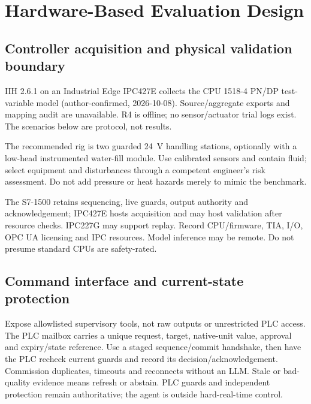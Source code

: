 \section{Hardware-Based Evaluation Design}
\label{sec:hardware}
\subsection{Controller acquisition and physical validation boundary}
IIH 2.6.1 on an Industrial Edge IPC427E collects the CPU 1518-4 PN/DP
test-variable model (author-confirmed, 2026-10-08). Source/aggregate exports and
mapping audit are unavailable. R4 is offline; no sensor/actuator trial logs
exist. The scenarios below are protocol, not results.

The recommended rig is two guarded 24~V handling stations, optionally with a
low-head instrumented water-fill module. Use calibrated sensors and contain
fluid; select equipment and disturbances through a competent engineer's risk
assessment. Do not add pressure or heat hazards merely to mimic the benchmark.

The S7-1500 retains sequencing, live guards, output authority and acknowledgement;
IPC427E hosts acquisition and may host validation after resource checks. IPC227G
may support replay. Record CPU/firmware, TIA, I/O, OPC UA licensing and IPC
resources. Model inference may be remote. Do not presume standard CPUs are
safety-rated.

\subsection{Command interface and current-state protection}
Expose allowlisted supervisory tools, not raw outputs or unrestricted PLC access.
The PLC mailbox carries a unique request, target, native-unit value, approval
and expiry/state reference. Use a staged sequence/commit handshake, then have
the PLC recheck current guards and record its decision/acknowledgement. Commission
duplicates, timeouts and reconnects without an LLM. Stale or bad-quality evidence
means refresh or abstain. PLC guards and independent protection remain authoritative;
the agent is outside hard-real-time control.

